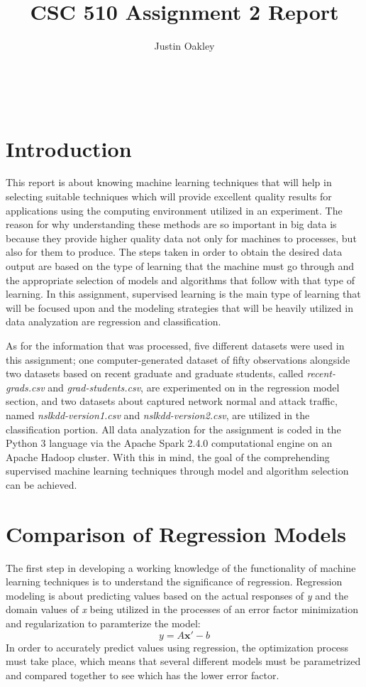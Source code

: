 \documentclass[a4paper,12pt]{IEEEtran}
\begin{document}
\title{CSC 510 Assignment 2 Report}
\author{Justin Oakley}
\maketitle\

\tableofcontents
\newpage

\section{Introduction}
This report is about knowing machine learning techniques that will help in selecting suitable techniques which will provide excellent quality results for applications using the computing environment utilized in an experiment. The reason for why understanding these methods are so important in big data is because they provide higher quality data not only for machines to processes, but also for them to produce. The steps taken in order to obtain the desired data output are based on the type of learning that the machine must go through and the appropriate selection of models and algorithms that follow with that type of learning. In this assignment, supervised learning is the main type of learning that will be focused upon and the modeling strategies that will be heavily utilized in data analyzation are regression and classification.

As for the information that was processed, five different datasets were used in this assignment; one computer-generated dataset of fifty observations alongside two datasets based on recent graduate and graduate students, called \textit{recent-grads.csv} and \textit{grad-students.csv}, are experimented on in the regression model section, and two datasets about captured network normal and attack traffic, named \textit{nslkdd-version1.csv} and \textit{nslkdd-version2.csv}, are utilized in the classification portion. All data analyzation for the assignment is coded in the Python 3 language via the Apache Spark 2.4.0 computational engine on an Apache Hadoop cluster. With this in mind, the goal of the comprehending supervised machine learning techniques through model and algorithm selection can be achieved.

\section{Comparison of Regression Models}
The first step in developing a working knowledge of the functionality of machine learning techniques is to understand the significance of regression. Regression modeling is about predicting values based on the actual responses of \textit{y} and the domain values of \textit{x} being utilized in the processes of an error factor minimization and regularization to paramterize the model:  \[\textit{y} = \textit{A}\textbf{x}' - \textit{b}\] In order to accurately predict values using regression, the optimization process must take place, which means that several different models must be parametrized and compared together to see which has the lower error factor.
\end{document}
